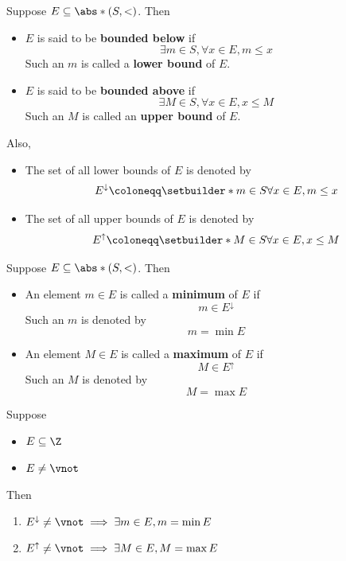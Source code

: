 \bigskip

\begin{definition} \label{an:def:boundedness}
  Suppose $E \subseteq \abs*{(S, <)}$. Then
  \begin{itemize}
    \item $E$ is said to be \textbf{bounded below} if
          \[
            \exists m \in S, \forall x \in E, m \leq x
          \]
          Such an $m$ is called a \textbf{lower bound} of $E$.
    \item $E$ is said to be \textbf{bounded above} if
          \[
            \exists M \in S, \forall x \in E, x \leq M
          \]
          Such an $M$ is called an \textbf{upper bound} of $E$.
  \end{itemize}
  Also,
  \begin{itemize}
    \item The set of all lower bounds of $E$ is denoted by
          \[
            E^{\downarrow} \coloneqq \setbuilder*{m \in S}{\forall x \in E, m \leq x}
          \]
    \item The set of all upper bounds of $E$ is denoted by
          \[
            E^{\uparrow} \coloneqq \setbuilder*{M \in S}{\forall x \in E, x \leq M}
          \]
  \end{itemize}
\end{definition}

\bigskip

\begin{definition} \label{an:def:extremum}
  Suppose $E \subseteq \abs*{(S, <)}$. Then
  \begin{itemize}
    \item An element $m \in E$ is called a \textbf{minimum} of $E$ if
          \[
            m \in E^{\downarrow}
          \]
          Such an $m$ is denoted by
          \[
            m = \min E
          \]
    \item An element $M \in E$ is called a \textbf{maximum} of $E$ if
          \[
            M \in E^{\uparrow}
          \]
          Such an $M$ is denoted by
          \[
            M = \max E
          \]
  \end{itemize}
\end{definition}

\bigskip

\begin{theorem} \label{an:thm:bounded-subset-of-Z-in-Z-has-extremum}
  Suppose
  \begin{itemize}
    \item $E \subseteq \Z$
    \item $E \neq \vnot$
  \end{itemize}
  Then
  \begin{enumerate}[label=\textbf{(\Alph*)}]
    \item $E^{\downarrow} \neq \vnot \implies \exists m \in E, m = \min E$
    \item $E^{\uparrow} \neq \vnot \implies \exists M \in E, M = \max E$
  \end{enumerate}
\end{theorem}

